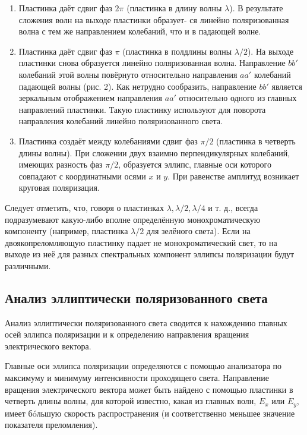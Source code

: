 \documentclass[a4paper, 12pt]{article}%
\begin{document}
 \begin{enumerate}
 		
 	\item Пластинка даёт сдвиг фаз $ 2\pi $ (пластинка в длину волны $ \lambda $). В результате сложения волн на выходе пластинки образует-
ся линейно поляризованная волна с тем же направлением колебаний, что и в падающей волне.

	\item Пластинка даёт сдвиг фаз $ \pi $ (пластинка в полдлины волны $ \lambda / 2 $). На выходе пластинки снова образуется линейно поляризованная волна. Направление $ bb' $ колебаний этой волны повёрнуто относительно направления $ aa' $ колебаний падающей волны (рис. 2). Как нетрудно сообразить, направление $ bb' $ является зеркальным отображением направления $ aa' $ относительно одного из главных направлений пластинки. Такую пластинку используют для поворота направления колебаний линейно поляризованного света.
	
	\item Пластинка создаёт между колебаниями сдвиг фаз $ \pi/2 $ (пластинка
в четверть длины волны). При сложении двух взаимно перпендикулярных колебаний, имеющих разность фаз $ \pi/2 $, образуется эллипс, главные оси которого совпадают с координатными осями $ x $ и $ y $. При равенстве амплитуд возникает круговая поляризация.
 	
 \end{enumerate}

Следует отметить, что, говоря о пластинках $ \lambda , \lambda/2, \lambda/4  $ и т. д., всегда подразумевают какую-либо вполне определённую монохроматическую
компоненту (например, пластинка $ \lambda/2 $ для зелёного света). Если на двоякопреломляющую пластинку падает не монохроматический свет, то на
выходе из неё для разных спектральных компонент эллипсы поляризации будут различными.

\subsection{Анализ эллиптически поляризованного света}

Анализ эллиптически поляризованного света сводится к нахождению главных осей
эллипса поляризации и к определению направления вращения электрического вектора.

Главные оси эллипса поляризации определяются с помощью анализатора по максимуму и минимуму интенсивности проходящего света.
Направление вращения электрического вектора может быть найдено
с помощью пластинки в четверть длины волны, для которой известно,
какая из главных волн, $ E_x $ или $ E_y $, имеет б\'{o}льшую скорость распространения (и соответственно меньшее значение показателя преломления).
\end{document}
